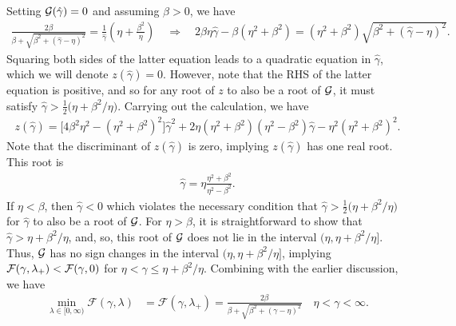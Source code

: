 \documentclass[a4paper,10pt]{article}
\begin{document}
Setting ${\cal G}(\hat{\gamma}) = 0$ and assuming $\beta > 0$, we have
\begin{align*}
\frac{2\beta}{\beta + \sqrt{\beta^2 + (\hat{\gamma}-\eta)^2}} 
=
\frac{1}{\hat{\gamma}} \left(\eta + \frac{\beta^2}{\eta} \right) 
\quad \Longrightarrow \quad
2\beta \eta \hat{\gamma} -\beta(\eta^2 + \beta^2) 
= 
(\eta^2 + \beta^2) \sqrt{\beta^2 + (\hat{\gamma}-\eta)^2}. 
\end{align*}
Squaring both sides of the latter equation leads to a quadratic equation in $\hat{\gamma}$, which we will denote $z(\hat{\gamma}) = 0$. However, note that the RHS of the latter equation is positive, and so for any root of $z$ to also be a root of ${\cal G}$, it must satisfy $\hat{\gamma} > \tfrac{1}{2} \big( \eta + \beta^2 / \eta)$. Carrying out the calculation, we have
\begin{align*}
z(\hat{\gamma}) = \big[ 4 \beta^2 \eta^2 - (\eta^2 + \beta^2)^2 \big] \hat{\gamma}^2 + 2 \eta (\eta^2 + \beta^2)(\eta^2 - \beta^2) \hat{\gamma} - \eta^2(\eta^2 + \beta^2)^2.
\end{align*}
%
Note that the discriminant of $z(\hat{\gamma})$ is zero, implying
$z(\hat{\gamma})$ has one real root. This root is
%
\begin{align} \label{eq:gamma_hat}
\hat{\gamma} = \eta \frac{\eta^2 + \beta^2}{\eta^2 - \beta^2}. 
\end{align}
%
If $\eta < \beta$, then $\hat{\gamma} < 0$ which violates the necessary condition that $\hat{\gamma} > \tfrac{1}{2} \big( \eta + \beta^2 / \eta)$ for $\hat{\gamma}$ to also be a root of ${\cal G}$. For $\eta > \beta$, it is straightforward to show that
$\hat{\gamma} > \eta+\beta^2/\eta$, and, so, this root of ${\cal G}$ does not lie in the interval $(\eta,\eta+\beta^2/\eta]$. Thus, ${\cal G}$ has no sign changes
in the interval $(\eta,\eta+\beta^2/\eta]$, implying
${\cal F} (\gamma, \lambda_+) < {\cal F}(\gamma, 0)$ for $\eta < \gamma
\leq \eta + \beta^2/\eta.$ Combining with the earlier discussion, we have
%
\begin{align*}
\min_{\lambda\in[0,\infty)} \mathcal{F}(\gamma,\lambda) &=
	\mathcal{F}(\gamma,\lambda_+) =
\frac{2\beta}{\beta + \sqrt{\beta^2 + (\gamma-\eta)^2}}
	\quad \eta < \gamma < \infty.
\end{align*}
%
\end{document}
